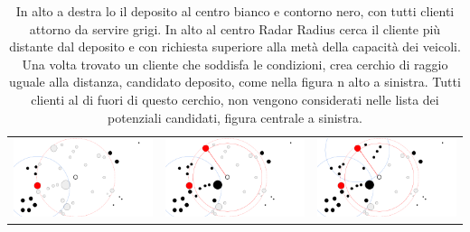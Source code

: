 \documentclass[]{article}
\begin{document}
\begin{table}
\begin{tabular}{c|c|c}
			\includegraphics[scale = 0.15]{images/RR7.png} & \includegraphics[scale = 0.15]{images/RR8.png} & \includegraphics[scale = 0.15]{images/RR9.png}\\
						
		\end{tabular}
		\caption{In alto a destra lo il deposito al centro bianco e contorno nero, con tutti  clienti attorno da servire grigi. In alto al centro Radar Radius cerca il cliente più distante dal deposito e con richiesta superiore alla metà della capacità dei veicoli. Una volta trovato un cliente che soddisfa le condizioni, crea cerchio di raggio uguale alla distanza, candidato deposito, come nella figura n alto a sinistra. Tutti clienti al di fuori di questo cerchio, non vengono considerati nelle lista dei potenziali candidati, figura centrale a sinistra.  }
		\label{Table:1}
\end{table}








\end{document}
